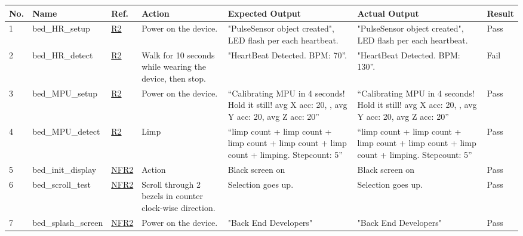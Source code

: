 \documentclass[12pt, titlepage]{article}
\begin{document}
\begin{center}
\begin{table} 
\begin{tabular}{ | p{0.5cm} | p{2.8cm} |  p{1.1cm} | p{2.7cm} | p{2.7cm} | p{2.7cm} | p{1.1cm} |}
\hline
\textbf{No.} & \textbf{Name}  & \textbf{Ref.} & \textbf{Action} & \textbf{Expected Output} & \textbf{Actual Output} & \textbf{Result} \\
\hline
 1 & bed\_HR\_setup & \href{https://github.com/zakerl/Capstone_Project/blob/main/docs/SRS/SRS.pdf}{R2} & Power on the device. & "PulseSensor object created", LED flash per each heartbeat. & "PulseSensor object created", LED flash per each heartbeat. & Pass \\ 
\hline
2 & bed\_HR\_detect & \href{https://github.com/zakerl/Capstone_Project/blob/main/docs/SRS/SRS.pdf}{R2} & Walk for 10 seconds while wearing the device, then stop. & "HeartBeat Detected. BPM: 70”. & "HeartBeat Detected. BPM: 130”. & Fail \\  
\hline
3 & bed\_MPU\newline \_setup & \href{https://github.com/zakerl/Capstone_Project/blob/main/docs/SRS/SRS.pdf}{R2} & Power on the device. & “Calibrating MPU in 4 seconds! Hold it still! avg X acc: 20, , avg Y acc: 20, avg Z acc: 20” & “Calibrating MPU in 4 seconds! Hold it still! avg X acc: 20, , avg Y acc: 20, avg Z acc: 20” & Pass \\  
\hline
4 & bed\_MPU\newline \_detect & \href{https://github.com/zakerl/Capstone_Project/blob/main/docs/SRS/SRS.pdf}{R2} & Limp & “limp count + limp count + limp count + limp count + limp count + limping. Stepcount: 5” & “limp count + limp count + limp count + limp count + limp count + limping. Stepcount: 5” & Pass \\ 
\hline
5 & bed\_init\_display & \href{https://github.com/zakerl/Capstone_Project/blob/main/docs/SRS/SRS.pdf}{NFR2} & Action & Black screen on & Black screen on & Pass \\ 
\hline
6 & bed\_scroll\_test &  \href{https://github.com/zakerl/Capstone_Project/blob/main/docs/SRS/SRS.pdf}{NFR2} & Scroll through 2 bezels in counter clock-wise direction. & Selection goes up. & Selection goes up. & Pass \\ 
\hline
7 & bed\_splash\newline \_screen & \href{https://github.com/zakerl/Capstone_Project/blob/main/docs/SRS/SRS.pdf}{NFR2} & Power on the device. & "Back End Developers" & "Back End Developers" & Pass \\ 

\end{tabular}
\end{table}
\end{center}
\end{document}
